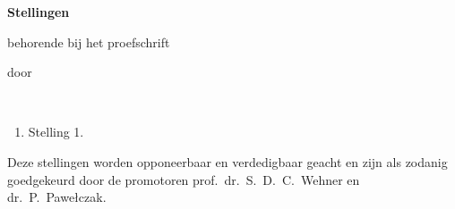 \begin{center}

{\Large\titlefont\bfseries Stellingen}

\medskip

behorende bij het proefschrift

\medskip

{\makeatletter
\titlestyle\bfseries\large\@title
\makeatother}

{\makeatletter
\ifx\@subtitle\undefined\else
\titlefont\titleshape\@subtitle
\fi
\makeatother}

\medskip

door

\medskip

\makeatletter
{\large\titlefont\bfseries\@firstname\ {\titleshape\@lastname}}
\makeatother

\end{center}

\bigskip

\begin{enumerate}
\item Stelling 1.
\end{enumerate}

\bigskip
\bigskip

\begin{center}
Deze stellingen worden opponeerbaar en verdedigbaar geacht en zijn als zodanig goedgekeurd door de
promotoren prof.\ dr.\ S.\ D.\ C.\ Wehner en dr.\ P.\ Pawełczak.
\end{center}
